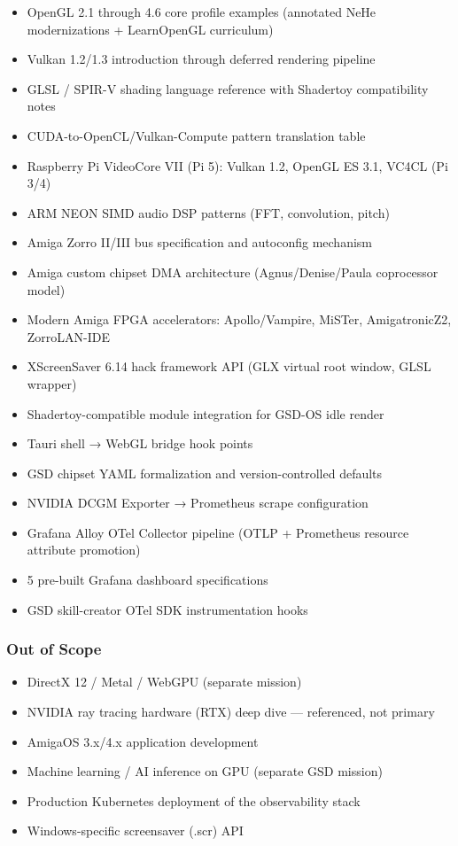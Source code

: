 \documentclass[11pt,letterpaper]{article}
\begin{document}
\begin{itemize}[noitemsep]
  \item OpenGL 2.1 through 4.6 core profile examples (annotated NeHe modernizations + LearnOpenGL curriculum)
  \item Vulkan 1.2/1.3 introduction through deferred rendering pipeline
  \item GLSL / SPIR-V shading language reference with Shadertoy compatibility notes
  \item CUDA-to-OpenCL/Vulkan-Compute pattern translation table
  \item Raspberry Pi VideoCore VII (Pi 5): Vulkan 1.2, OpenGL ES 3.1, VC4CL (Pi 3/4)
  \item ARM NEON SIMD audio DSP patterns (FFT, convolution, pitch)
  \item Amiga Zorro II/III bus specification and autoconfig mechanism
  \item Amiga custom chipset DMA architecture (Agnus/Denise/Paula coprocessor model)
  \item Modern Amiga FPGA accelerators: Apollo/Vampire, MiSTer, AmigatronicZ2, ZorroLAN-IDE
  \item XScreenSaver 6.14 hack framework API (GLX virtual root window, GLSL wrapper)
  \item Shadertoy-compatible module integration for GSD-OS idle render
  \item Tauri shell → WebGL bridge hook points
  \item GSD chipset YAML formalization and version-controlled defaults
  \item NVIDIA DCGM Exporter → Prometheus scrape configuration
  \item Grafana Alloy OTel Collector pipeline (OTLP + Prometheus resource attribute promotion)
  \item 5 pre-built Grafana dashboard specifications
  \item GSD skill-creator OTel SDK instrumentation hooks
\end{itemize}

\subsubsection{Out of Scope}

\begin{itemize}[noitemsep]
  \item DirectX 12 / Metal / WebGPU (separate mission)
  \item NVIDIA ray tracing hardware (RTX) deep dive — referenced, not primary
  \item AmigaOS 3.x/4.x application development
  \item Machine learning / AI inference on GPU (separate GSD mission)
  \item Production Kubernetes deployment of the observability stack
  \item Windows-specific screensaver (.scr) API
\end{itemize}
\end{document}

